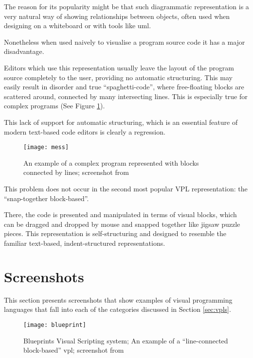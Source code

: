 The reason for its popularity might be that such diagrammatic representation is a very natural way of showing relationships between objects, often used when designing on a whiteboard\cite{whiteboard_design} or with tools like \acrlong{uml}\cite{uml}.

Nonetheless when used naively to visualise a program source code it has a major disadvantage.

Editors which use this representation usually leave the layout of the program source completely to the user, providing no automatic structuring. This may easily result in disorder and true ``spaghetti-code'', where free-floating blocks are scattered around, connected by many intersecting lines. This is especially true for complex programs (See Figure \ref{fig:mess}).

This lack of support for automatic structuring, which is an essential feature of
modern text-based code editors is clearly a regression.

\begin{figure}[h!]
    \centering \texttt{[image: mess]}
    \caption{
        An example of a complex program represented with blocks connected by lines;
        screenshot from \protect\cite{fig_mess}
    }
    \label{fig:mess}
\end{figure}

This problem does not occur in the second most popular VPL representation: the ``snap-together block-based''.

There, the code is presented and manipulated in terms of visual blocks, which can be dragged and dropped by mouse and snapped together like jigsaw puzzle pieces. This representation is self-structuring and designed to resemble the familiar text-based, indent-structured representations.


\clearpage
\section{Screenshots}\label{sec:screenshots}
This section presents screenshots that show examples of visual programming languages that fall into each of the categories discussed in Section \ref{sec:vpls}.

\begin{figure}[h!]
    \centering \texttt{[image: blueprint]}
    \caption{
        Blueprints Visual Scripting system;
        An example of a ``line-connected block-based'' \acrshort{vpl};
        screenshot from \protect\cite{fig_blueprint}
    }
    \label{fig:blueprint}
\end{figure}

